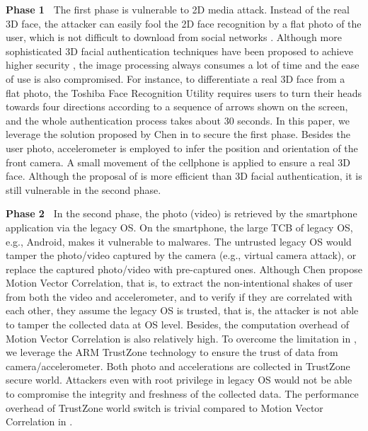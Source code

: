 \noindent
{\bf Phase 1~}
The first phase is vulnerable to 2D media attack. Instead of the real 3D face,
the attacker can easily fool the 2D face recognition by a flat photo of the
user, which is not difficult to download from social networks
\cite{android-attack}.  Although more
sophisticated 3D facial authentication techniques have been proposed to achieve
higher security \cite{Chaua-3D, Blanz-3D},  the image processing always consumes
a lot of time and the ease of use is also compromised.  For instance, to
differentiate a real 3D face from a flat photo, the Toshiba Face Recognition
Utility requires users to turn their heads towards four directions according to
a sequence of arrows shown on the screen, and the whole authentication process
takes about 30 seconds.  In this paper, we leverage the solution
proposed by Chen \etal in \cite{Chen-Sensor} to secure the first phase. Besides
the user photo, accelerometer is employed to infer the position and orientation
of the front camera. A small movement of the cellphone is applied to ensure a
real 3D face. Although the proposal of \cite{Chen-Sensor} is more efficient than 3D
facial authentication, it is still vulnerable in the second phase. 

\noindent
{\bf Phase 2~}
In the second phase, the photo (video) is retrieved by the smartphone application via
the legacy OS. On the smartphone, the large TCB of legacy OS, e.g., Android,
makes it vulnerable to malwares.  The untrusted legacy OS would tamper the
photo/video captured by the camera (e.g., virtual camera attack), or replace the
captured photo/video with pre-captured ones. Although Chen \etal
\cite{Chen-Sensor} propose Motion Vector Correlation, that is, to extract the
non-intentional shakes of user from both the video and accelerometer, and to
verify if they are correlated with each other, they assume the legacy OS is
trusted, that is, the attacker is not able to tamper the collected data at OS
level.  Besides, the computation overhead of Motion Vector Correlation is also
relatively high. To overcome the limitation in \cite{Chen-Sensor}, we leverage the
ARM TrustZone technology to ensure the trust of data from camera/accelerometer.
Both photo and accelerations are collected in TrustZone secure world.  Attackers
even with root privilege in legacy OS would not be able to compromise the
integrity and freshness of the collected data. The performance overhead of
TrustZone world switch is trivial compared to Motion Vector Correlation in
\cite{Chen-Sensor}.

